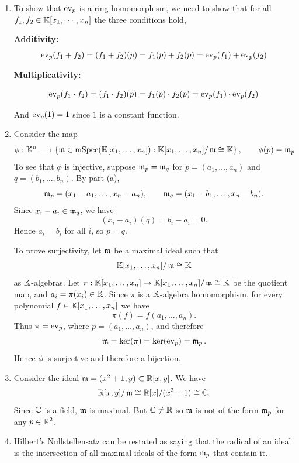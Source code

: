 \documentclass[Notebook.tex]{subfiles}
\begin{document}
\begin{solution}
    \bbni
    \begin{enumerate}[label=(\alph*),ref=\theenumi\alph*]
        \item To show that $\operatorname{ev}_p$ is a ring homomorphism, we need to show that for all $f_1, f_2 \in \mathbb K[x_1, \cdots, x_n]$ the three conditions hold, 

        \textbf{Additivity:} 
        \[
            \operatorname{ev}_p(f_1 + f_2) = (f_1+f_2)(p) 
            = f_1(p) + f_2(p) 
            = \operatorname{ev}_p(f_1) + \operatorname{ev}_p(f_2)
        \]

        \textbf{Multiplicativity:}

        \[
            \operatorname{ev}_p(f_1 \cdot f_2) = (f_1\cdot f_2)(p) 
            = f_1(p) \cdot f_2(p) 
            = \operatorname{ev}_p(f_1) \cdot \operatorname{ev}_p(f_2)
        \]
        
        And $\operatorname{ev}_p(1) = 1$ since $1$ is a constant function. 

        \item Consider the map
            \[
            \phi:\mathbb K^n\longrightarrow
            \left\{
            \operatorname{\mathfrak{m}}\in \operatorname{mSpec}(\mathbb K[x_1,\ldots,x_n]) :
            \mathbb K[x_1,\ldots,x_n]/\operatorname{\mathfrak{m}}\cong \mathbb K
            \right\}, \qquad  \phi(p)=\operatorname{\mathfrak{m}}_p
            \]
            To see that $\phi$ is injective, suppose
            $\operatorname{\mathfrak{m}}_p=\operatorname{\mathfrak{m}}_q$ for $p=(a_1,\ldots,a_n)$ and $q=(b_1,\ldots,b_n)$. By part (a),
            \[
            \operatorname{\mathfrak{m}}_p=(x_1-a_1,\ldots,x_n-a_n),
            \qquad
            \operatorname{\mathfrak{m}}_q=(x_1-b_1,\ldots,x_n-b_n).
            \]
            Since $x_i-a_i\in \operatorname{\mathfrak{m}}_q$, we have
            \[
            (x_i-a_i)(q)=b_i-a_i=0.
            \]
            Hence $a_i=b_i$ for all $i$, so $p=q$.

            To prove surjectivity, let $\operatorname{\mathfrak{m}}$ be a maximal ideal such that
            \[
            \mathbb K[x_1,\ldots,x_n]/\operatorname{\mathfrak{m}}\cong \mathbb K
            \]
            as $\mathbb K$-algebras. Let $ \pi:\mathbb K[x_1,\ldots,x_n]\to
            \mathbb K[x_1,\ldots,x_n]/\operatorname{\mathfrak{m}}\cong\mathbb K$
            be the quotient map, and 
            $a_i=\pi(x_i)\in \mathbb K$. 
            Since $\pi$ is a $\mathbb K$-algebra homomorphism, for every polynomial
            $f\in \mathbb K[x_1,\ldots,x_n]$ we have
            \[
            \pi(f)=f(a_1,\ldots,a_n).
            \]
            Thus $\pi=\operatorname{ev}_p$, where $p=(a_1,\ldots,a_n)$, and therefore
            \[
            \operatorname{\mathfrak{m}}=\ker(\pi)=\ker(\operatorname{ev}_p)=\operatorname{\mathfrak{m}}_p.
            \]
            Hence $\phi$ is surjective and therefore a bijection.
        \item Consider the ideal $\operatorname{\mathfrak{m}}=(x^2+1,y)\subset \mathbb R[x,y]$. We have
            \[
            \mathbb R[x,y]/\operatorname{\mathfrak{m}}
            \cong
            \mathbb R[x]/(x^2+1)
            \cong
            \mathbb C.
            \]
            Since $\mathbb C$ is a field, $\operatorname{\mathfrak{m}}$ is maximal. But $\mathbb C \neq \mathbb R$ so $\operatorname{\mathfrak{m}}$ is not of the form $\operatorname{\mathfrak{m}}_p$
            for any $p\in\mathbb R^2$.
        \item Hilbert's Nullstellensatz can be restated as saying that the
        radical of an ideal is the intersection of all maximal ideals of the
        form $\operatorname{\mathfrak{m}}_p$ that contain it.
    \end{enumerate}
\end{solution}
\end{document}

